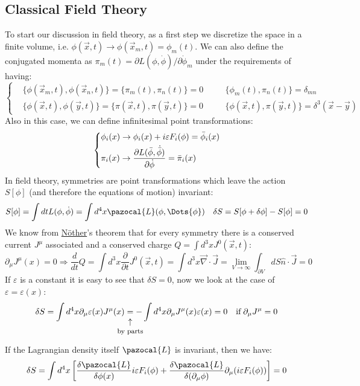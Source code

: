 \documentclass[../main.tex]{subfiles}
\begin{document}
\subsection{Classical Field Theory}
To start our discussion in field theory, as a first step we discretize the space in a finite volume, i.e. $\phi(\Vec{x},t)\to\phi(\Vec{x}_m,t)=\phi_m(t)$. We can also define the conjugated momenta as $\pi_m(t)=\partial L(\phi,\Dot{\phi})/\partial\Dot{\phi}_m$ under the requirements of having:
\[
\left\{
\begin{aligned}
&\{\phi(\Vec{x}_m,t),\phi(\Vec{x}_n,t)\}=\{\pi_m(t),\pi_n(t)\}=0 \quad &&\{\phi_m(t),\pi_n(t)\}=\delta_{mn}\\
&\{\phi(\Vec{x},t),\phi(\Vec{y},t)\}=\{\pi(\Vec{x},t),\pi(\Vec{y},t)\}=0 \quad &&\{\phi(\Vec{x},t),\pi(\Vec{y},t)\}=\delta^3(\Vec{x}-\Vec{y})
\end{aligned}
\right.
\]
Also in this case, we can define infinitesimal point transformations:
\[
\left\{
\begin{aligned}
&\phi_i(x)\to\phi_i(x)+i\varepsilon F_i(\phi)=\Bar{\phi}_i(x)\\
&\pi_i(x)\to\frac{\partial L(\Bar{\phi},\Dot{\Bar{\phi}})}{\partial\Dot{\phi}}=\Bar{\pi}_i(x)
\end{aligned}
\right.
\]
In field theory, symmetries are point transformations which leave the action $S[\phi]$ (and therefore the equations of motion) invariant:
\[
S[\phi]=\int dt L(\phi,\Dot{\phi})=\int d^4x\pazocal{L}(\phi,\Dots{\phi}) \quad \delta S=S[\phi+\delta\phi]-S[\phi]=0
\]
We know from \href{https://en.wikipedia.org/wiki/Emmy_Noether}{N\"other}'s theorem that for every symmetry there is a conserved current $J^\mu$ associated and a conserved charge $Q=\int d^3xJ^0(\Vec{x},t)$:
\[
\partial_\mu J^\mu(x)=0\Rightarrow \frac{d}{dt}Q=\int d^3x\frac{\partial}{\partial t}J^0(\Vec{x},t)=\int d^3x\Vec{\nabla}\cdot\Vec{J}=\lim_{V\to\infty}\int_{\partial V}dS\hat{n}\cdot\Vec{J}=0
\]
If $\varepsilon$ is a constant it is easy to see that $\delta S=0$, now we look at the case of $\varepsilon=\varepsilon(x)$:
\[
\delta S=\int d^4x\partial_\mu\varepsilon(x)J^\mu(x)\underset{\mathclap{\tikz \node {$\uparrow$} node [below=1ex] {\footnotesize by parts };}}{=}-\int d^4x\partial_\mu J^\mu(x)\varepsilon(x)=0 \quad \text{if}\;\partial_\mu J^\mu=0
\]
If the Lagrangian density itself $\pazocal{L}$ is invariant, then we have:
\[
\delta S=\int d^4x\left[\frac{\delta\pazocal{L}}{\delta\phi(x)}i\varepsilon F_i(\phi)+\frac{\delta\pazocal{L}}{\delta(\partial_\mu\phi)}\partial_\mu(i\varepsilon F_i(\phi))\right]=0
\]
\end{document}
